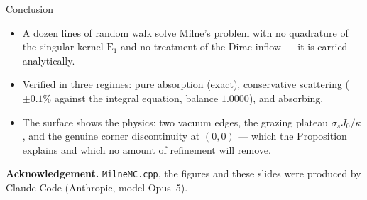 \documentclass[aspectratio=169,10pt]{beamer}
\newcommand{\E}{\mathrm{E}}
\newcommand{\MC}{\texttt{MilneMC.cpp}}
\begin{document}
\begin{frame}{Conclusion}
\begin{itemize}
\item A dozen lines of random walk solve Milne's problem with no quadrature of the
singular kernel $\E_1$ and no treatment of the Dirac inflow --- it is carried analytically.
\item Verified in three regimes: pure absorption (exact), conservative scattering
($\pm0.1\%$ against the integral equation, balance $1.0000$), and absorbing.
\item The surface shows the physics: two vacuum edges, the grazing plateau
$\sigma_sJ_0/\kappa$, and the genuine corner discontinuity at $(0,0)$ --- which the
Proposition explains and which no amount of refinement will remove.
\end{itemize}
\vfill
{\footnotesize\textbf{Acknowledgement.} \MC, the figures and these slides were produced by
Claude Code (Anthropic, model Opus~5).}
\end{frame}
\end{document}
